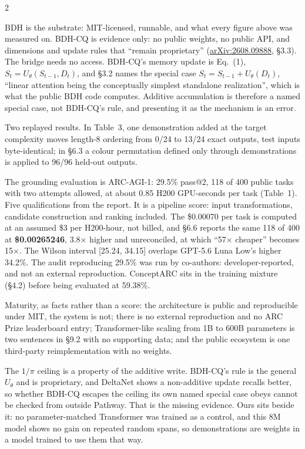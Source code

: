 \documentclass[a4paper,9pt]{extarticle}
\newcommand{\sect}[1]{\vspace{0.65ex}{\sffamily\bfseries\fontsize{7.2}{7.8}\selectfont\color{accent}\MakeUppercase{#1}}\par\vspace{0.15ex}}
\newcommand{\num}[1]{\textbf{#1}}
\newcommand{\arx}[1]{\href{https://arxiv.org/abs/#1}{arXiv:#1}}
\begin{document}
\begin{multicols}{2}

\sect{BDH and BDH-CQ}
BDH is the substrate: MIT-licensed, runnable, and what every figure above was measured on. BDH-CQ is
evidence only: no public weights, no public API, and dimensions and update rules that ``remain
proprietary'' (\arx{2608.09888}, \S3.3). The bridge needs no access. BDH-CQ's
memory update is Eq.~(1), $S_t = U_\theta(S_{t-1}, D_t)$, and \S3.2 names the special case
$S_t = S_{t-1} + U_\theta(D_t)$, ``linear attention being the conceptually simplest standalone
realization'', which is what the public BDH code computes. Additive accumulation is therefore a named
special case, not BDH-CQ's rule, and presenting it as the mechanism is an error.

Two replayed results. In Table~3, one demonstration added at the target complexity moves length-8
ordering from 0/24 to 13/24 exact outputs, test inputs byte-identical; in \S6.3 a colour permutation
defined only through demonstrations is applied to 96/96 held-out outputs.

\sect{Evidence and maturity}
The grounding evaluation is ARC-AGI-1: 29.5\% pass@2, 118 of 400 public tasks with two attempts
allowed, at about 0.85 H200 GPU-seconds per task (Table~1). Five qualifications from the report.
It is a pipeline score: input transformations, candidate construction and ranking included. The
\$0.00070 per task is computed at an assumed \$3 per H200-hour, not billed, and \S6.6 reports the
same 118 of 400 at \num{\$0.00265246}, 3.8$\times$ higher and unreconciled, at which
``57$\times$ cheaper'' becomes 15$\times$. The Wilson interval [25.24, 34.15] overlaps GPT-5.6
Luna Low's higher 34.2\%. The audit reproducing 29.5\% was run by co-authors:
developer-reported, and not an external reproduction. ConceptARC sits in the training mixture
(\S4.2) before being evaluated at 59.38\%.

Maturity, as facts rather than a score: the architecture is public and reproducible under MIT, the
system is not; there is no external reproduction and no ARC Prize leaderboard entry;
Transformer-like scaling from 1B to 600B parameters is two sentences in \S9.2 with no supporting
data; and the public ecosystem is one third-party reimplementation with no weights.

\sect{The open question}
The $1/\pi$ ceiling is a property of the additive write. BDH-CQ's rule is the general $U_\theta$ and
is proprietary, and DeltaNet shows a non-additive update recalls better, so whether BDH-CQ escapes
the ceiling its own named special case obeys cannot be checked from outside Pathway. That is the
missing evidence. Ours sits beside it: no parameter-matched Transformer was trained as a control, and
this 8M model shows no gain on repeated random spans, so demonstrations are weights in a model
trained to use them that way.

\end{multicols}
\end{document}
